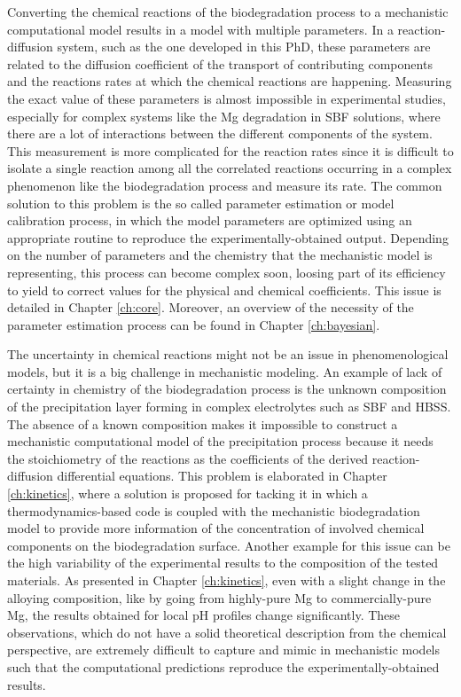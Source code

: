 Converting the chemical reactions of the biodegradation process to a mechanistic computational model results in a model with multiple parameters. In a reaction-diffusion system, such as the one developed in this PhD, these parameters are related to the diffusion coefficient of the transport of contributing components and the reactions rates at which the chemical reactions are happening. Measuring the exact value of these parameters is almost impossible in experimental studies, especially for complex systems like the Mg degradation in SBF solutions, where there are a lot of interactions between the different components of the system. This measurement is more complicated for the reaction rates since it is difficult to isolate a single reaction among all the correlated reactions occurring in a complex phenomenon like the biodegradation process and measure its rate. The common solution to this problem is the so called parameter estimation or model calibration process, in which the model parameters are optimized using an appropriate routine to reproduce the experimentally-obtained output. Depending on the number of parameters and the chemistry that the mechanistic model is representing, this process can become complex soon, loosing part of its efficiency to yield to correct values for the physical and chemical coefficients. This issue is detailed in Chapter \ref{ch:core}. Moreover, an overview of the necessity of the parameter estimation process can be found in Chapter \ref{ch:bayesian}.

The uncertainty in chemical reactions might not be an issue in phenomenological models, but it is a big challenge in mechanistic modeling. An example of lack of certainty in chemistry of the biodegradation process is the unknown composition of the precipitation layer forming in complex electrolytes such as SBF and HBSS. The absence of a known composition makes it impossible to construct a mechanistic computational model of the precipitation process because it needs the stoichiometry of the reactions as the coefficients of the derived reaction-diffusion differential equations. This problem is elaborated in Chapter \ref{ch:kinetics}, where a solution is proposed for tacking it in which a thermodynamics-based code is coupled with the mechanistic biodegradation model to provide more information of the concentration of involved chemical components on the biodegradation surface. Another example for this issue can be the high variability of the experimental results to the composition of the tested materials. As presented in Chapter \ref{ch:kinetics}, even with a slight change in the alloying composition, like by going from highly-pure Mg to commercially-pure Mg, the results obtained for local pH profiles change significantly. These observations, which do not have a solid theoretical description from the chemical perspective, are extremely difficult to capture and mimic in mechanistic models such that the computational predictions reproduce the experimentally-obtained results. 




